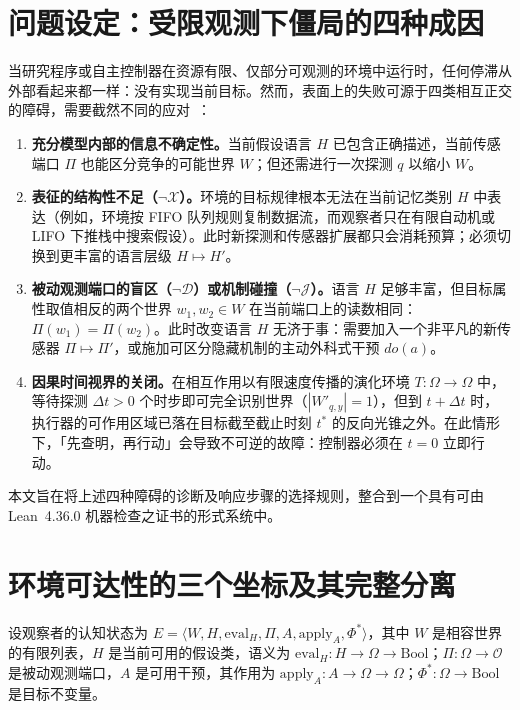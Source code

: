 \documentclass[11pt,a4paper]{article}
\theoremstyle{cleanthm}
\theoremstyle{cleandef}
\begin{document}
\section{问题设定：受限观测下僵局的四种成因}

当研究程序或自主控制器在资源有限、仅部分可观测的环境中运行时，任何停滞从外部看起来都一样：没有实现当前目标。然而，表面上的失败可源于四类相互正交的障碍，需要截然不同的应对~\cite{reiter1987,pearl2009,wolpert2008}：
\begin{enumerate}
  \item \textbf{充分模型内部的信息不确定性。}当前假设语言 $H$ 已包含正确描述，当前传感端口 $\Pi$ 也能区分竞争的可能世界 $W$；但还需进行一次探测 $q$ 以缩小 $W$。
  \item \textbf{表征的结构性不足（$\neg\mathcal{X}$）。}环境的目标规律根本无法在当前记忆类别 $H$ 中表达（例如，环境按 FIFO 队列规则复制数据流，而观察者只在有限自动机或 LIFO 下推栈中搜索假设）。此时新探测和传感器扩展都只会消耗预算；必须切换到更丰富的语言层级 $H\mapsto H'$。
  \item \textbf{被动观测端口的盲区（$\neg\mathcal{D}$）或机制碰撞（$\neg\mathcal{J}$）。}语言 $H$ 足够丰富，但目标属性取值相反的两个世界 $w_1,w_2\in W$ 在当前端口上的读数相同：$\Pi(w_1)=\Pi(w_2)$。此时改变语言 $H$ 无济于事：需要加入一个非平凡的新传感器 $\Pi\mapsto\Pi'$，或施加可区分隐藏机制的主动外科式干预 $do(a)$。
  \item \textbf{因果时间视界的关闭。}在相互作用以有限速度传播的演化环境 $T:\Omega\to\Omega$ 中，等待探测 $\Delta t>0$ 个时步即可完全识别世界（$|W'_{q,y}|=1$），但到 $t+\Delta t$ 时，执行器的可作用区域已落在目标截至截止时刻 $t^*$ 的反向光锥之外。在此情形下，「先查明，再行动」会导致不可逆的故障：控制器必须在 $t=0$ 立即行动。
\end{enumerate}

本文旨在将上述四种障碍的诊断及响应步骤的选择规则，整合到一个具有可由 Lean~4.36.0 机器检查之证书的形式系统中。

\section{环境可达性的三个坐标及其完整分离}

设观察者的认知状态为 $E = \langle W, H, \mathrm{eval}_H, \Pi, A, \mathrm{apply}_A, \Phi^*\rangle$，其中 $W$ 是相容世界的有限列表，$H$ 是当前可用的假设类，语义为 $\mathrm{eval}_H:H\to\Omega\to\mathrm{Bool}$；$\Pi:\Omega\to\mathcal{O}$ 是被动观测端口，$A$ 是可用干预，其作用为 $\mathrm{apply}_A:A\to\Omega\to\Omega$；$\Phi^*:\Omega\to\mathrm{Bool}$ 是目标不变量。
\end{document}

